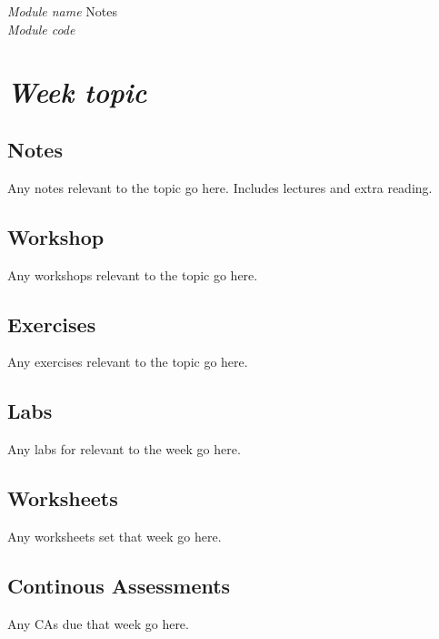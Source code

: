 \documentclass[a4paper]{report}
\begin{document}
\begin{titlepage}
	\raggedleft
	\vspace*{2cm}
	\Huge{\textit{Module name} Notes}\\
	\vspace{0.5cm}
	\large{\textit{Module code}}
\end{titlepage}

\tableofcontents

\newpage

\chapter{\textit{Week topic}}

\section{Notes}

Any notes relevant to the topic go here. Includes lectures and extra reading.

\section{Workshop}

Any workshops relevant to the topic go here.

\section{Exercises}

Any exercises relevant to the topic go here.

\section{Labs}

Any labs for relevant to the week go here.

\section{Worksheets}

Any worksheets set that week go here.

\section{Continous Assessments}

Any CAs due that week go here.
\end{document}
